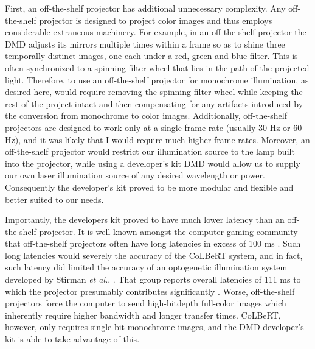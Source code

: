 First, an off-the-shelf projector has additional unnecessary complexity. Any off-the-shelf projector is designed to project color images and thus employs considerable extraneous machinery. For example, in an off-the-shelf projector the DMD adjusts its mirrors multiple times within a frame so as to shine three temporally distinct images, one each under a red, green and blue filter. This is often synchronized to a spinning filter wheel that lies in the path of the projected light. Therefore, to use an off-the-shelf projector for monochrome illumination, as desired here, would require removing the spinning filter wheel while keeping the rest of the project intact and then compensating for any artifacts introduced by the conversion from monochrome to color images. Additionally, off-the-shelf projectors are designed to work only at a single frame rate (usually 30 Hz or 60 Hz), and it was likely that I would require much higher frame rates.  Moreover, an off-the-shelf projector would restrict our illumination source to the lamp built into the projector, while using a developer's kit DMD would allow us to supply our own laser illumination source of any desired wavelength or power. Consequently the developer's kit proved to be  more modular and flexible and better suited to our needs. 

Importantly, the developers kit proved to have much lower latency than an off-the-shelf projector.  It is well known amongst the computer gaming community that off-the-shelf projectors often have long latencies in excess of 100 ms  \citep{livolsi_projectors_2008}. Such long latencies would severely  the accuracy of the CoLBeRT system, and in fact, such latency did limited the accuracy of an optogenetic illumination system developed by Stirman \textit{et al.}, \citep{stirman_real-time_2011}. That group reports overall latencies of 111 ms to which the projector presumably contributes significantly \citep{stirman_multispectral_2012}.  Worse,  off-the-shelf projectors force the computer to send  high-bitdepth full-color images which inherently require higher bandwidth and longer transfer times. CoLBeRT, however, only requires single bit monochrome images, and the DMD developer's kit is able to take advantage of this. 


